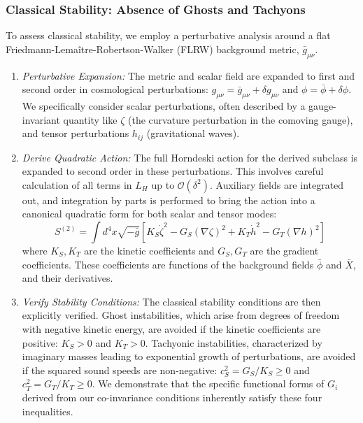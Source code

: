 \documentclass[twocolumn]{aastex631}
\begin{document}
\subsubsection{Classical Stability: Absence of Ghosts and Tachyons}
To assess classical stability, we employ a perturbative analysis around a flat Friedmann-Lemaître-Robertson-Walker (FLRW) background metric, $\bar{g}_{\mu\nu}$.
\begin{enumerate}
    \item \textit{Perturbative Expansion:} The metric and scalar field are expanded to first and second order in cosmological perturbations: $g_{\mu\nu} = \bar{g}_{\mu\nu} + \delta g_{\mu\nu}$ and $\phi = \bar{\phi} + \delta\phi$. We specifically consider scalar perturbations, often described by a gauge-invariant quantity like $\zeta$ (the curvature perturbation in the comoving gauge), and tensor perturbations $h_{ij}$ (gravitational waves).
    \item \textit{Derive Quadratic Action:} The full Horndeski action for the derived subclass is expanded to second order in these perturbations. This involves careful calculation of all terms in $L_H$ up to $\mathcal{O}(\delta^2)$. Auxiliary fields are integrated out, and integration by parts is performed to bring the action into a canonical quadratic form for both scalar and tensor modes:
    $$
    S^{(2)} = \int d^4x \sqrt{-\bar{g}} \left[ K_S \dot{\zeta}^2 - G_S (\nabla\zeta)^2 + K_T \dot{h}^2 - G_T (\nabla h)^2 \right]
    $$
    where $K_S, K_T$ are the kinetic coefficients and $G_S, G_T$ are the gradient coefficients. These coefficients are functions of the background fields $\bar{\phi}$ and $\bar{X}$, and their derivatives.
    \item \textit{Verify Stability Conditions:} The classical stability conditions are then explicitly verified. Ghost instabilities, which arise from degrees of freedom with negative kinetic energy, are avoided if the kinetic coefficients are positive: $K_S > 0$ and $K_T > 0$. Tachyonic instabilities, characterized by imaginary masses leading to exponential growth of perturbations, are avoided if the squared sound speeds are non-negative: $c_S^2 = G_S/K_S \ge 0$ and $c_T^2 = G_T/K_T \ge 0$. We demonstrate that the specific functional forms of $G_i$ derived from our co-invariance conditions inherently satisfy these four inequalities.
\end{enumerate}
\end{document}
